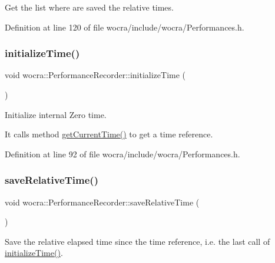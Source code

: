 Get the list where are saved the relative times. 

Definition at line 120 of file wocra/include/wocra/\+Performances.\+h.

\hypertarget{classwocra_1_1PerformanceRecorder_af1e2e645007a910e8d3af72f1d6aeaeb}{}\label{classwocra_1_1PerformanceRecorder_af1e2e645007a910e8d3af72f1d6aeaeb} 
\subsubsection{\texorpdfstring{initialize\+Time()}{initializeTime()}}
{\footnotesize\ttfamily void wocra\+::\+Performance\+Recorder\+::initialize\+Time (\begin{DoxyParamCaption}{ }\end{DoxyParamCaption})\hspace{0.3cm}{\ttfamily [inline]}}

Initialize internal Zero time.

It calls method \hyperlink{classwocra_1_1PerformanceRecorder_aca4cee19319252b823be15e1f217825e}{get\+Current\+Time()} to get a time reference. 

Definition at line 92 of file wocra/include/wocra/\+Performances.\+h.

\hypertarget{classwocra_1_1PerformanceRecorder_af17f8912dee957329f961eec5fb45e9f}{}\label{classwocra_1_1PerformanceRecorder_af17f8912dee957329f961eec5fb45e9f} 
\subsubsection{\texorpdfstring{save\+Relative\+Time()}{saveRelativeTime()}}
{\footnotesize\ttfamily void wocra\+::\+Performance\+Recorder\+::save\+Relative\+Time (\begin{DoxyParamCaption}{ }\end{DoxyParamCaption})\hspace{0.3cm}{\ttfamily [inline]}}

Save the relative elapsed time since the time reference, i.\+e. the last call of \hyperlink{classwocra_1_1PerformanceRecorder_af1e2e645007a910e8d3af72f1d6aeaeb}{initialize\+Time()}.

